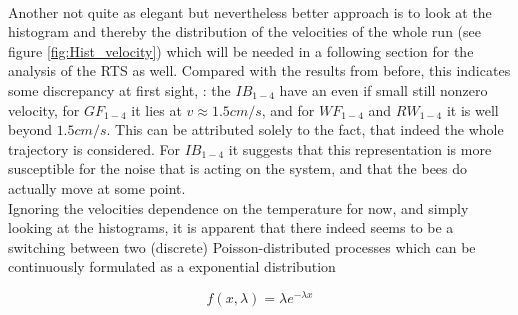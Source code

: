 

\\
Another not quite as elegant but nevertheless better approach is to look at the histogram and thereby the distribution of the velocities of the whole run (see figure \ref{fig:Hist_velocity}) which will be needed in a following section for the analysis of the RTS as well. Compared with the results from before, this indicates some discrepancy at first sight, : the $IB_{1-4}$ have an even if small still nonzero velocity, for $GF_{1-4}$ it lies at $v \approx 1.5cm/s$, and for $WF_{1-4}$ and $RW_{1-4}$ it is well beyond $1.5 cm/s$. This can be attributed solely to the fact, that indeed the whole trajectory is considered. For $IB_{1-4}$ it suggests that this representation is more susceptible for the noise that is acting on the system, and that the bees do actually move at some point. 
\\
Ignoring the velocities dependence on the temperature for now, and simply looking at the histograms, it is apparent that there indeed seems to be a switching between two (discrete) Poisson-distributed processes which can be continuously formulated as a exponential distribution

\begin{equation}
    f(x, \lambda) = \lambda e^{-\lambda x}
    \label{eq:Exponential_PDF} 
\end{equation}

